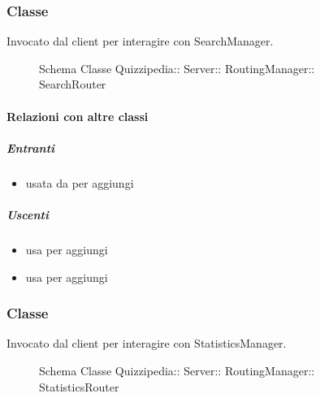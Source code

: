 \subsubsection{Classe }
Invocato dal client per interagire con SearchManager.
\begin{figure}[H]
\centering
\noindent{}
\caption[Schema Classe SearchRouter]{Schema Classe Quizzipedia:: Server:: RoutingManager:: SearchRouter}
\end{figure}
\paragraph{Relazioni con altre classi}
\subparagraph{Entranti}
\begin{itemize}
\item usata da  per aggiungi
\end{itemize}
\subparagraph{Uscenti}
\begin{itemize}
\item usa  per aggiungi
\item usa  per aggiungi
\end{itemize}
\subsubsection{Classe }
Invocato dal client per interagire con StatisticsManager.
\begin{figure}[H]
\centering
\noindent{}
\caption[Schema Classe StatisticsRouter]{Schema Classe Quizzipedia:: Server:: RoutingManager:: StatisticsRouter}
\end{figure}
